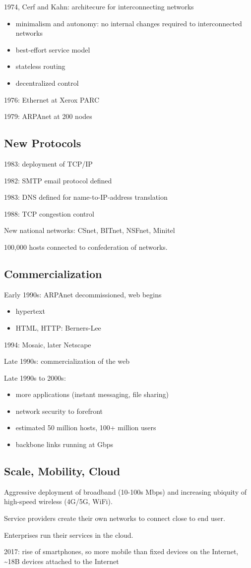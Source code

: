 \documentclass[11pt]{article}
\begin{document}
1974, Cerf and Kahn: architecure for interconnecting networks
\begin{itemize}
\item minimalism and autonomy: no internal changes required to interconnected networks
\item best-effort service model
\item stateless routing
\item decentralized control
\end{itemize}

1976: Ethernet at Xerox PARC

1979: ARPAnet at 200 nodes
\subsection{New Protocols}
\label{sec:orgcfa8043}
1983: deployment of TCP/IP

1982: SMTP email protocol defined

1983: DNS defined for name-to-IP-address translation

1988: TCP congestion control

New national networks: CSnet, BITnet, NSFnet, Minitel

100,000 hosts connected to confederation of networks.
\subsection{Commercialization}
\label{sec:orgbb30ee3}
Early 1990s: ARPAnet decommissioned, web begins
\begin{itemize}
\item hypertext
\item HTML, HTTP: Berners-Lee
\end{itemize}

1994: Mosaic, later Netscape

Late 1990s: commercialization of the web

Late 1990s to 2000s:
\begin{itemize}
\item more applications (instant messaging, file sharing)
\item network security to forefront
\item estimated 50 million hosts, 100+ million users
\item backbone links running at Gbps
\end{itemize}
\subsection{Scale, Mobility, Cloud}
\label{sec:org77ab12a}
Aggressive deployment of broadband (10-100s Mbps) and increasing ubiquity of high-speed wireless
(4G/5G, WiFi).

Service providers create their own networks to connect close to end user.

Enterprises run their services in the cloud.

2017: rise of smartphones, so more mobile than fixed devices on the Internet, \textasciitilde{}18B devices attached to
the Internet
\end{document}

